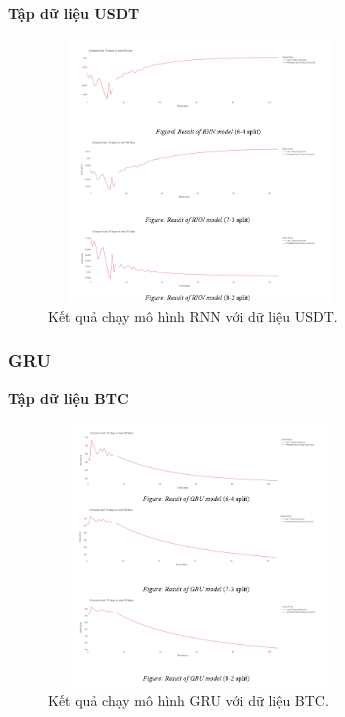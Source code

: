 \documentclass[conference]{IEEEtran}
\begin{document}
\textbf{Tập dữ liệu USDT}
\begin{figure}[H] %
    \centering
    \includegraphics[width=8cm, height=7cm]{Images/RNN-USDT.png} %
    \caption{Kết quả chạy mô hình RNN với dữ liệu USDT.}
    \label{fig:arima-model}
\end{figure}

\subsubsection{GRU} \textbf{Tập dữ liệu BTC}
\begin{figure}[H] %
    \centering
    \includegraphics[width=8cm, height=7cm]{Images/Gru-BTC.png} %
    \caption{Kết quả chạy mô hình GRU với dữ liệu BTC.}
    \label{fig:arima-model}
\end{figure}
\end{document}
